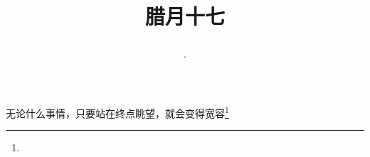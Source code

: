 \title{\date[d=27,m=1,y=2024][year:cn-y,年,month:cn,day:cn,日,·,weekday]·腊月十七 }
无论什么事情，只要站在终点眺望，就会变得宽容\footnote{ }

